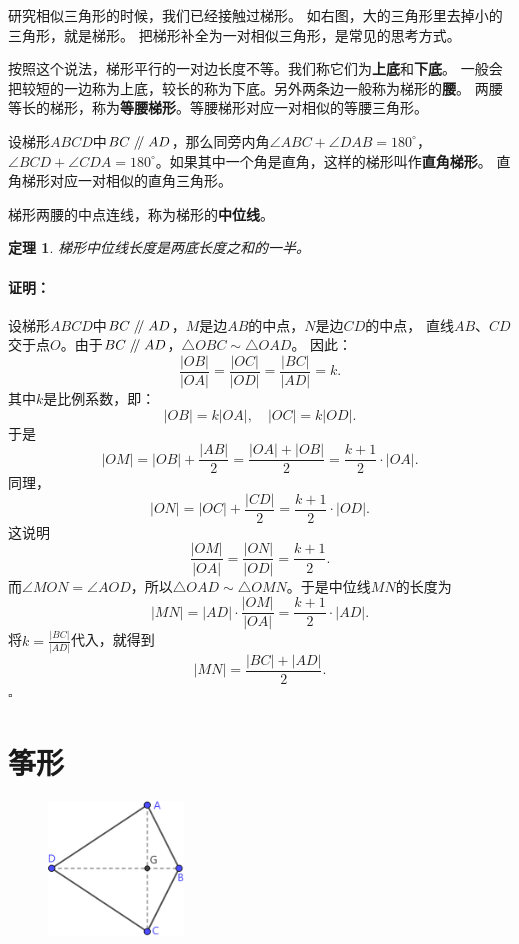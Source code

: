 \documentclass[12pt,UTF8]{ctexbook}
\newtheorem{tm}{定理}[section]
\newenvironment{proof2}{\paragraph{\textbf{证明：}}}{\hfill$\square$}
\renewcommand\parallel{\mathrel{/\mskip-4mu/}}
\begin{document}
研究相似三角形的时候，我们已经接触过梯形。
如右图，大的三角形里去掉小的三角形，就是梯形。
把梯形补全为一对相似三角形，是常见的思考方式。

按照这个说法，梯形平行的一对边长度不等。我们称它们为\textbf{上底}和\textbf{下底}。
一般会把较短的一边称为上底，较长的称为下底。另外两条边一般称为梯形的\textbf{腰}。
两腰等长的梯形，称为\textbf{等腰梯形}。等腰梯形对应一对相似的等腰三角形。

设梯形$ABCD$中$BC \parallel AD$，那么同旁内角$\angle ABC + \angle DAB = 180^\circ$，
$\angle BCD + \angle CDA = 180^\circ$。如果其中一个角是直角，这样的梯形叫作\textbf{直角梯形}。
直角梯形对应一对相似的直角三角形。

梯形两腰的中点连线，称为梯形的\textbf{中位线}。
\begin{tm}\label{tm:0-2-20}
    梯形中位线长度是两底长度之和的一半。
\end{tm}
\begin{proof2}
    设梯形$ABCD$中$BC \parallel AD$，$M$是边$AB$的中点，$N$是边$CD$的中点，
    直线$AB$、$CD$交于点$O$。由于$BC \parallel AD$，$\triangle OBC \sim \triangle OAD$。
    因此：
    $$ \frac{|OB|}{|OA|} = \frac{|OC|}{|OD|} = \frac{|BC|}{|AD|} = k.$$
    其中$k$是比例系数，即：
    $$ |OB| = k|OA|, \quad |OC| = k|OD|.$$
    于是
    $$ |OM| = |OB| + \frac{|AB|}{2} = \frac{|OA| + |OB|}{2} = \frac{k+1}{2} \cdot|OA|.$$
    同理，
    $$ |ON| = |OC| + \frac{|CD|}{2} = \frac{k+1}{2}\cdot|OD|. $$
    这说明
    $$ \frac{|OM|}{|OA|} = \frac{|ON|}{|OD|} = \frac{k+1}{2}. $$
    而$\angle MON = \angle AOD$，所以$\triangle OAD \sim \triangle OMN$。于是中位线$MN$的长度为
    $$ |MN| = |AD| \cdot \frac{|OM|}{|OA|} = \frac{k+1}{2}\cdot|AD|. $$
    将$k = \frac{|BC|}{|AD|}$代入，就得到
    $$ |MN| = \frac{|BC| + |AD|}{2}. $$
\end{proof2}

\section{筝形}

\begin{figure} %
    \vspace{-5pt}
    \centering
    \includegraphics[width=0.32\textwidth]{筝形1.png}
\end{figure}
\end{document}
